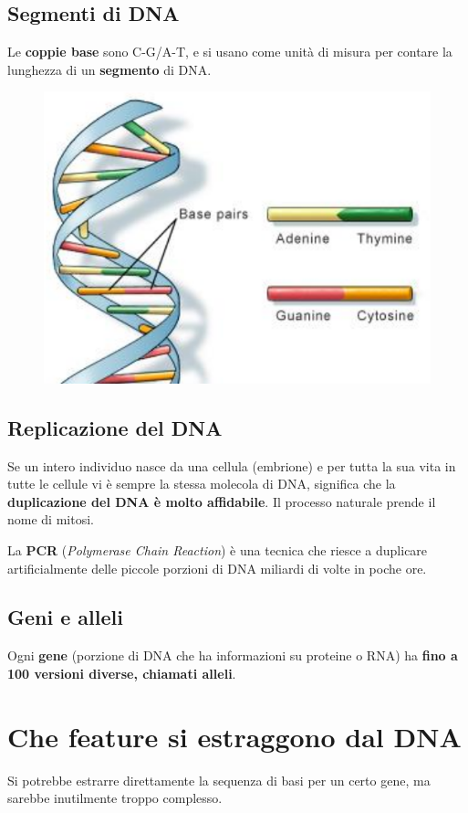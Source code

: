 \documentclass{report}
\begin{document}
\subsection{Segmenti di DNA}

\noindent Le \textbf{coppie base} sono C-G/A-T, e si usano 
come unità di misura per contare la lunghezza di un \textbf{segmento} di DNA.

\begin{figure}[H]
    \centering
    \includegraphics[width=0.6\linewidth]{images/elica.png}
\end{figure}


\subsection{Replicazione del DNA}
Se un intero individuo nasce da una cellula (embrione) e per 
tutta la sua vita in tutte le cellule vi è sempre la stessa 
molecola di DNA, significa che la \textbf{duplicazione del DNA è molto affidabile}. Il
processo naturale prende il nome di mitosi.

\noindent La \textbf{PCR} (\textit{Polymerase Chain Reaction}) è una tecnica che 
riesce a duplicare artificialmente delle piccole porzioni di DNA miliardi di volte 
in poche ore.

\subsection{Geni e alleli}
Ogni \textbf{gene} (porzione di 
DNA che ha informazioni su proteine o RNA) ha \textbf{fino 
a 100 versioni diverse, chiamati alleli}.


\section{Che feature si estraggono dal DNA}

Si potrebbe estrarre direttamente la sequenza di basi per un certo gene, ma sarebbe inutilmente troppo complesso.
\end{document}
